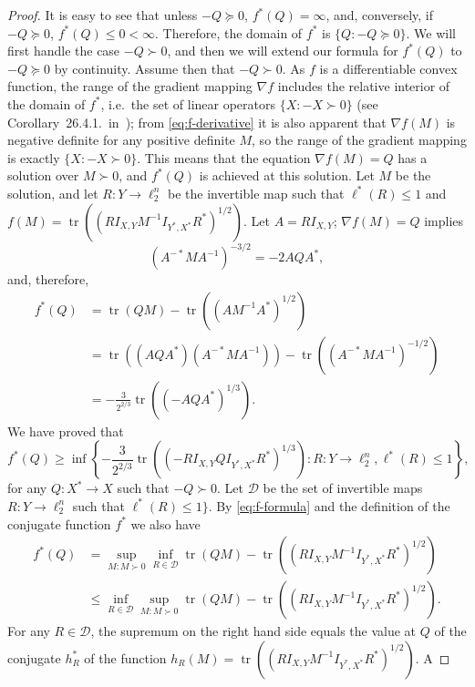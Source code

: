 \documentclass{article}
\DeclareMathOperator{\tr}{tr}
\begin{document}
\begin{proof}
  It is easy to see that unless $-Q \succeq 0$, $f^*(Q) = \infty$,
  and, conversely, if $-Q \succeq 0$, $f^*(Q) \le 0 <
  \infty$. Therefore, the domain of $f^*$ is $\{Q: -Q \succeq 0\}$. We
  will first handle the case $-Q \succ 0$, and then we will extend our
  formula for $f^*(Q)$ to $-Q \succeq 0$ by continuity. Assume then
  that $-Q \succ 0$. As $f$ is a differentiable convex function, the
  range of the gradient mapping $\nabla f$ includes the relative
  interior of the domain of $f^*$, i.e.~the set of linear operators
  $\{X: -X \succ 0\}$ (see Corollary~26.4.1.~in~\cite{Rockafellar});
  from \eqref{eq:f-derivative} it is also apparent that $\nabla f(M)$
  is negative definite for any positive definite $M$, so the range of
  the gradient mapping is exactly $\{X: -X \succ 0\}$. This means that
  the equation $\nabla f(M) = Q$ has a solution over $M \succ 0$, and
  $f^*(Q)$ is achieved at this solution. Let $M$ be the solution, and
  let $R:Y \to \ell_2^n$ be the invertible map such that $\ell^*(R)
  \le 1$ and $f(M) = \tr((RI_{X,Y}M^{-1}I_{Y^*,X^*}R^*)^{1/2})$. Let
  $A = RI_{X,Y}$; $\nabla f(M) = Q$ implies
  \[
  (A^{-*} M A^{-1})^{-3/2} = -2 AQA^*,
  \]
  and, therefore,
  \begin{align*}
    f^*(Q) &= \tr(QM) - \tr((AM^{-1}A^*)^{1/2})\\
    &= \tr((AQA^*)(A^{-*}MA^{-1})) -   \tr((A^{-*}MA^{-1})^{-1/2})\\
    &= -\frac{3}{2^{2/3}} \tr((-AQA^*)^{1/3}).
  \end{align*}
  We have proved that
  \begin{equation}\label{eq:conjugate-lb}
  f^*(Q) \ge 
  \inf\left\{ -\frac{3}{2^{2/3}} \tr((-RI_{X,Y}QI_{Y^*,X^*}R^*)^{1/3}):
  R:Y \to \ell_2^n,\ell^*(R) \le 1\right\},
  \end{equation}
  for any $Q:X^*\to X$ such that $-Q \succ 0$.  Let $\mathcal{D}$ be
  the set of invertible maps $R:Y \to \ell_2^n$ such that $\ell^*(R)
  \le 1\}$. By \eqref{eq:f-formula} and the definition of the
  conjugate function $f^*$ we also have
  \begin{align*}
  f^*(Q) &= 
  \sup_{M: M \succ 0} 
  \inf_{R \in \mathcal{D}}
  \tr(QM) - \tr((RI_{X,Y}M^{-1}I_{Y^*,X^*}R^*)^{1/2})\\
  &\le
  \inf_{R \in \mathcal{D}}
  \sup_{M: M \succ 0} 
  \tr(QM) - \tr((RI_{X,Y}M^{-1}I_{Y^*,X^*}R^*)^{1/2}).
  \end{align*}
  For any $R \in \mathcal{D}$, the supremum on the right hand side
  equals the value at $Q$ of the conjugate $h^*_R$ of the
  function $h_R(M) = \tr((RI_{X,Y}M^{-1}I_{Y^*,X^*}R^*)^{1/2})$. A

\end{proof}
\end{document}

